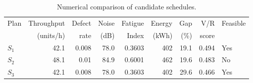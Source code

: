 \begin{table}[htbp]
\centering
\caption{Numerical comparison of candidate schedules.}
\label{tab:numerical-sim}
\small
\begin{tabular}{@{}lrrrrrrrl@{}}
\toprule
Plan & Throughput & Defect & Noise & Fatigue & Energy & Gap & V/R & Feasible \\
     & (units/h)  & rate   & (dB)  & Index   & (kWh)  & (\%) & score &         \\
\midrule
$S_{1}$ & 42.1 & 0.008 & 78.0 & 0.3603 & 402 & 19.1 & 0.494 & Yes \\
$S_{2}$ & 48.1 & 0.01 & 84.9 & 0.6001 & 462 & 19.6 & 0.483 & No \\
$S_{3}$ & 42.1 & 0.008 & 78.0 & 0.3603 & 402 & 29.6 & 0.466 & Yes \\
\bottomrule
\end{tabular}
\end{table}
